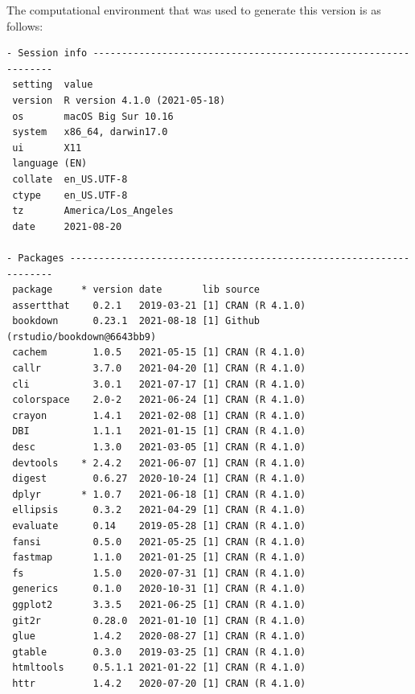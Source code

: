 \documentclass [11pt, proquest] {uwthesis}[2015/03/03]
\begin{document}
The computational environment that was used to generate this version is as follows:
\begin{verbatim}
- Session info ---------------------------------------------------------------
 setting  value                       
 version  R version 4.1.0 (2021-05-18)
 os       macOS Big Sur 10.16         
 system   x86_64, darwin17.0          
 ui       X11                         
 language (EN)                        
 collate  en_US.UTF-8                 
 ctype    en_US.UTF-8                 
 tz       America/Los_Angeles         
 date     2021-08-20                  

- Packages -------------------------------------------------------------------
 package     * version date       lib source                               
 assertthat    0.2.1   2019-03-21 [1] CRAN (R 4.1.0)                       
 bookdown      0.23.1  2021-08-18 [1] Github (rstudio/bookdown@6643bb9)    
 cachem        1.0.5   2021-05-15 [1] CRAN (R 4.1.0)                       
 callr         3.7.0   2021-04-20 [1] CRAN (R 4.1.0)                       
 cli           3.0.1   2021-07-17 [1] CRAN (R 4.1.0)                       
 colorspace    2.0-2   2021-06-24 [1] CRAN (R 4.1.0)                       
 crayon        1.4.1   2021-02-08 [1] CRAN (R 4.1.0)                       
 DBI           1.1.1   2021-01-15 [1] CRAN (R 4.1.0)                       
 desc          1.3.0   2021-03-05 [1] CRAN (R 4.1.0)                       
 devtools    * 2.4.2   2021-06-07 [1] CRAN (R 4.1.0)                       
 digest        0.6.27  2020-10-24 [1] CRAN (R 4.1.0)                       
 dplyr       * 1.0.7   2021-06-18 [1] CRAN (R 4.1.0)                       
 ellipsis      0.3.2   2021-04-29 [1] CRAN (R 4.1.0)                       
 evaluate      0.14    2019-05-28 [1] CRAN (R 4.1.0)                       
 fansi         0.5.0   2021-05-25 [1] CRAN (R 4.1.0)                       
 fastmap       1.1.0   2021-01-25 [1] CRAN (R 4.1.0)                       
 fs            1.5.0   2020-07-31 [1] CRAN (R 4.1.0)                       
 generics      0.1.0   2020-10-31 [1] CRAN (R 4.1.0)                       
 ggplot2       3.3.5   2021-06-25 [1] CRAN (R 4.1.0)                       
 git2r         0.28.0  2021-01-10 [1] CRAN (R 4.1.0)                       
 glue          1.4.2   2020-08-27 [1] CRAN (R 4.1.0)                       
 gtable        0.3.0   2019-03-25 [1] CRAN (R 4.1.0)                       
 htmltools     0.5.1.1 2021-01-22 [1] CRAN (R 4.1.0)                       
 httr          1.4.2   2020-07-20 [1] CRAN (R 4.1.0)                       

\end{verbatim}
\end{document}
